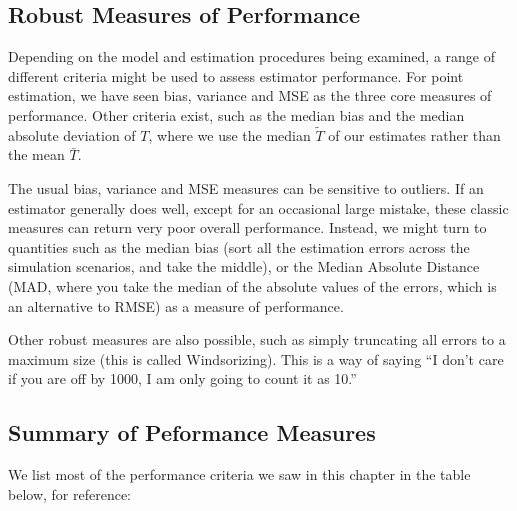 \documentclass[
]{book}
\begin{document}
\subsection{Robust Measures of Performance}\label{robust-measures-of-performance}

Depending on the model and estimation procedures being examined, a range of different criteria might be used to assess estimator performance.
For point estimation, we have seen bias, variance and MSE as the three core measures of performance.
Other criteria exist, such as the median bias and the median absolute deviation of \(T\), where we use the median \(\tilde{T}\) of our estimates rather than the mean \(\bar{T}\).

The usual bias, variance and MSE measures can be sensitive to outliers.
If an estimator generally does well, except for an occasional large mistake, these classic measures can return very poor overall performance.
Instead, we might turn to quantities such as the median bias (sort all the estimation errors across the simulation scenarios, and take the middle), or the Median Absolute Distance (MAD, where you take the median of the absolute values of the errors, which is an alternative to RMSE) as a measure of performance.

Other robust measures are also possible, such as simply truncating all errors to a maximum size (this is called Windsorizing).
This is a way of saying ``I don't care if you are off by 1000, I am only going to count it as 10.''

\subsection{Summary of Peformance Measures}\label{summary-of-peformance-measures}

We list most of the performance criteria we saw in this chapter in the table below, for reference:
\end{document}
